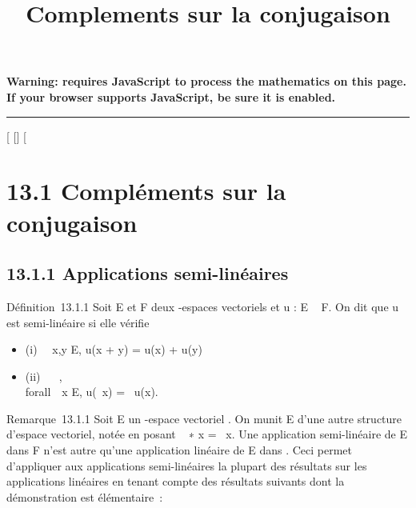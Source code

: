 \documentclass[]{article}
\title{Complements sur la conjugaison}
\author{}
\date{}
\begin{document}
\maketitle

\textbf{Warning: 
requires JavaScript to process the mathematics on this page.\\ If your
browser supports JavaScript, be sure it is enabled.}

\begin{center}\rule{3in}{0.4pt}\end{center}

[
[]
[

\section{13.1 Compléments sur la conjugaison}

\subsection{13.1.1 Applications semi-linéaires}

Définition~13.1.1 Soit E et F deux -espaces vectoriels et u : E \rightarrow~ F. On
dit que u est semi-linéaire si elle vérifie

\begin{itemize}
\itemsep1pt\parskip0pt
\item
  (i) \forall~~x,y \in E, u(x + y) = u(x) + u(y)
\item
  (ii) \forall~\lambda~ \in {}, \\forall~~x \in
  E, u(\lambda~x) = \overline\lambda~u(x).
\end{itemize}

Remarque~13.1.1 Soit E un -espace vectoriel . On munit E d'une autre
structure d'espace vectoriel, notée \checkE en posant
\lambda~ ∗ x = \overline\lambda~x. Une application semi-linéaire de
E dans F n'est autre qu'une application linéaire de E dans
\checkF. Ceci permet d'appliquer aux applications
semi-linéaires la plupart des résultats sur les applications linéaires
en tenant compte des résultats suivants dont la démonstration est
élémentaire~:
\end{document}
